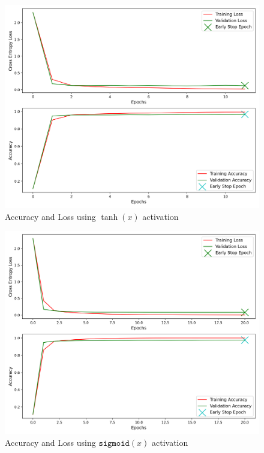 \begin{figure}[h]
	\centering
	\includegraphics[width=1.0\textwidth]{./images/activation_tanh.png}
	\caption{Accuracy and Loss using $\tanh(x)$ activation}
	\label{fig:tanh}
\end{figure}


\begin{figure}[h]
	\centering
	\includegraphics[width=1.0\textwidth]{./images/activation_sigmoid.png}
	\caption{Accuracy and Loss using $\texttt{sigmoid}(x)$ activation}
	\label{fig:sigmoid}
\end{figure}

